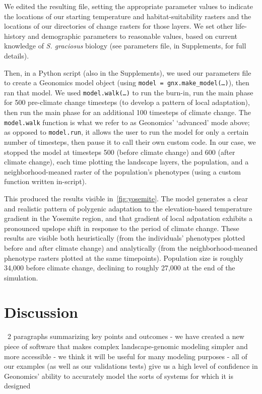 ﻿\documentclass{article}
\begin{document}
We edited the resulting file, setting the appropriate parameter values to indicate
the locations of our starting temperature and habitat-suitability rasters
and the locations of our directories of change rasters for
those layers. We set other life-history and demographic parameters to reasonable values,
based on current knowledge of \emph{S. graciosus} biology (see parameters file, in Supplements,
for full details).

Then, in a Python script (also in the Supplements), we used our parameters file to
create a Geonomics model object (using \texttt{model = gnx.make\_model(\ldots)}), then
ran that model. We used \texttt{model.walk(\ldots)} to run the burn-in,
run the main phase for 500 pre-climate change timesteps
(to develop a pattern of local adaptation),
then run the main phase for an additional 100 timesteps of climate change.
The \texttt{model.walk} function is what we refer to as Geonomics' `advanced' mode above;
as opposed to \texttt{model.run}, it allows the user to run the model for only a certain number
of timesteps, then pause it to call their own custom code.
In our case, we stopped the model at timesteps 500 (before climate change) and 600
(after climate change), each time plotting the landscape layers, the population,
and a neighborhood-meaned raster of the population's phenotypes (using a custom
function written in-script).

This produced the results visible in~\ref{fig:yosemite}.
The model generates a clear and realistic pattern of polygenic adaptation to
the elevation-based temperature gradient in the Yosemite region, and that
gradient of local adpatation exhibits a pronounced upslope shift in response to
the period of climate change. These results are visible both heuristically
(from the individuals' phenotypes plotted before and after climate change)
and analytically (from the neighborhood-meaned phenotype rasters plotted at the same timepoints).
Population size is roughly 34,000 before climate change, declining to roughly 27,000
at the end of the simulation.


\section{Discussion}

\large{~2 paragraphs summarizing key points and outcomes}
- we have created a new piece of software that makes complex landscape-genomic modeling
simpler and more accessible
- we think it will be useful for many modeling purposes
- all of our examples (as well as our validations tests) give us a high level of confidence
in Geonomics' ability to accurately model the sorts of systems for which it is designed
\end{document}
